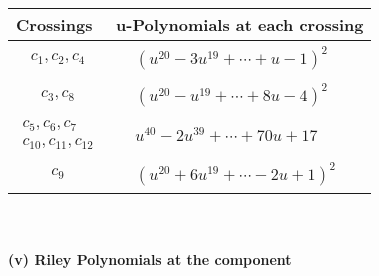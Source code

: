 \documentclass[1p]{elsarticle_modified}
\theoremstyle{definition}
\begin{document}
\begin{tabular}{m{50pt}|m{274pt}}
Crossings & \hspace{64pt}u-Polynomials at each crossing \\
\hline $$\begin{aligned}c_{1},c_{2},c_{4}\end{aligned}$$&$\begin{aligned}
&(u^{20}-3 u^{19}+\cdots+u-1)^{2}
\end{aligned}$\\
\hline $$\begin{aligned}c_{3},c_{8}\end{aligned}$$&$\begin{aligned}
&(u^{20}- u^{19}+\cdots+8 u-4)^{2}
\end{aligned}$\\
\hline $$\begin{aligned}c_{5},c_{6},c_{7}\\c_{10},c_{11},c_{12}\end{aligned}$$&$\begin{aligned}
&u^{40}-2 u^{39}+\cdots+70 u+17
\end{aligned}$\\
\hline $$\begin{aligned}c_{9}\end{aligned}$$&$\begin{aligned}
&(u^{20}+6 u^{19}+\cdots-2 u+1)^{2}
\end{aligned}$\\
\hline
\end{tabular}\\~\\
\newpage\renewcommand{\arraystretch}{1}
\flushleft \textbf{(v) Riley Polynomials at the component}\newline \\
\end{document}
